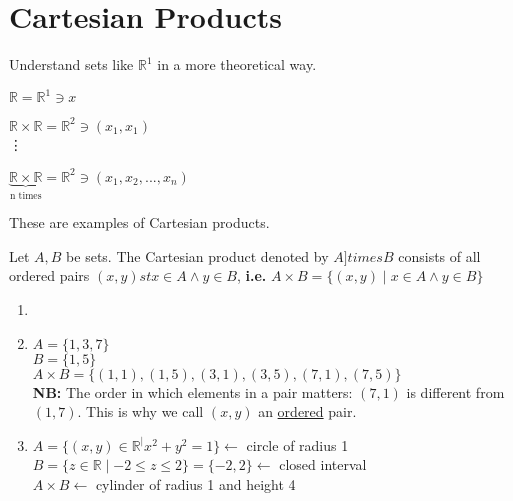 \documentclass[10pt]{article}
\begin{document}
	\section{Cartesian Products}
	\begin{description}
		\item[Task:] Understand sets like $\mathbb{R}^1$ in a more theoretical way.
		\item[Recall from Calculus:]
		\item $\mathbb{R} = \mathbb{R}^1 \ni x$
		\item $\mathbb{R} \times \mathbb{R} = \mathbb{R}^2 \ni (x_1, x_1)$ \\ \vdots
		\item $\underbrace{\mathbb{R} \times \mathbb{R}}_{\text{n times}} = \mathbb{R}^2 \ni (x_1, x_2, ..., x_n)$
		\item These are examples of Cartesian products.
		\item[Definition:] Let $A, B$ be sets. The Cartesian product denoted by $A ]times B$ consists of all ordered pairs $(x, y) st x \in A \land y \in B$, \textbf{i.e.} $A \times B = \{(x, y) \mid x \in A \land y \in B \}$
		\item[Further Examples:]
		\begin{enumerate}
			\item[]
			\item $A = \{1, 3, 7\}$ \\
			$B = \{1, 5\}$ \\
			$A \times B = \{(1, 1), (1, 5), (3, 1), (3, 5), (7, 1), (7, 5)\}$ \\
			\textbf{NB:} The order in which elements in a pair matters: $(7, 1)$ is different from $(1, 7)$. This is why we call $(x, y)$ an \underline{ordered} pair.
			\item $A = \{(x, y) \in \mathbb{R}^ \mid x^2 + y^2 = 1 \} \leftarrow$ circle of radius 1 \\
			$B = \{z \in \mathbb{R} \mid -2 \leq z \leq 2 \} = \{-2, 2\} \leftarrow$ closed interval \\
			$A \times B \leftarrow$ cylinder of radius 1 and height 4
		\end{enumerate}
	\end{description}
	
\end{document}
